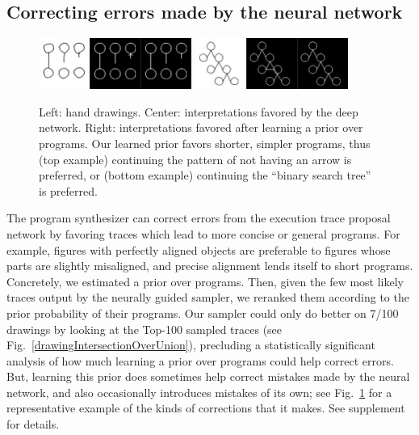\documentclass{article}
\begin{document}
\subsection{Correcting errors made by the neural network}\label{synthesizerHelpsParsing}
\begin{figure}\vspace{-1cm}
  \includegraphics[width = 5cm]{figures/programSuccess7.png}
  \includegraphics[width = 5cm]{figures/programSuccess16.png}
  \caption{Left: hand drawings. Center: interpretations favored by the deep network. Right: interpretations favored after learning a prior over programs. Our learned prior favors shorter, simpler programs, thus (top example) continuing the pattern of not having an arrow is preferred, or (bottom example) continuing the ``binary search tree'' is preferred.}\label{exampleOfProgramCorrectingMistake}
  \end{figure}
The program synthesizer can correct errors from the execution
trace proposal network by favoring traces which lead to more
concise or general programs.  For example, figures with perfectly aligned objects are preferable to figures whose parts are slightly misaligned, and precise alignment lends itself to short
programs.  Concretely, we estimated a prior over programs. Then,
given the few most likely traces output by the neurally guided sampler,
we reranked them according to the prior probability of their programs.
Our sampler could only do better on
7/100 drawings by looking at the Top-100 sampled traces
(see Fig.~\ref{drawingIntersectionOverUnion}),
precluding a statistically significant analysis of how much
learning a prior over programs could help correct errors.
But,
learning this prior does sometimes
help correct mistakes made by the neural network, and also
occasionally introduces mistakes of its own; see
Fig.~\ref{exampleOfProgramCorrectingMistake} for a representative
example of the kinds of corrections that it makes.
See supplement for details.
\end{document}
